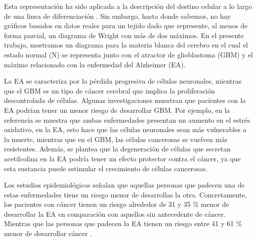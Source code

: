 Esta representación ha sido aplicada a la descripción del destino celular a lo largo de una linea de diferenciación \cite{casey2020theory}. Sin embargo, hasta donde sabemos, no hay gráficos basados en datos reales para un tejido dado que represente, al menos de forma parcial, un diagrama de Wright con más de dos máximos. En el presente trabajo, mostramos un diagrama para la materia blanca del cerebro en el cual el estado normal (N) se representa junto con el atractor de glioblastoma (GBM) y el máximo relacionado con la enfermedad del Alzheimer (EA).

La EA se caracteriza por la pérdida progresiva de células neuronales, mientras que el GBM es un tipo de cáncer cerebral que implica la proliferación descontrolada de células. Algunas investigaciones muestran que pacientes con la EA podrían tener un menor riesgo de desarrollar GBM. Por ejemplo, en la referencia \cite{ou2012does} se muestra que ambas enfermedades presentan un aumento en el estrés oxidativo, en la EA, esto hace que las células neuronales sean más vulnerables a la muerte, mientras que en el GBM, las células cancerosas se vuelven más resistentes. Además, se plantea que la degeneración de células que secretan acetilcolina en la EA podría tener un efecto protector contra el cáncer, ya que esta sustancia puede estimular el crecimiento de células cancerosas.


Los estudios epidemiológicos señalan que aquellas personas que padecen una de estas enfermedades tiene un riesgo menor de desarrollas la otra. Concretamente, los pacientes con cáncer tienen un riesgo alrededor de 31 y 35 \% menor de desarrollar la EA en comparación con aquellos sin antecedente de cáncer. Mientras que las personas que padecen la EA tienen un riesgo entre 41 y 61 \% menor de desarrollar cáncer \cite{Roe_2010, Driver_2012, Musicco_2013}.

